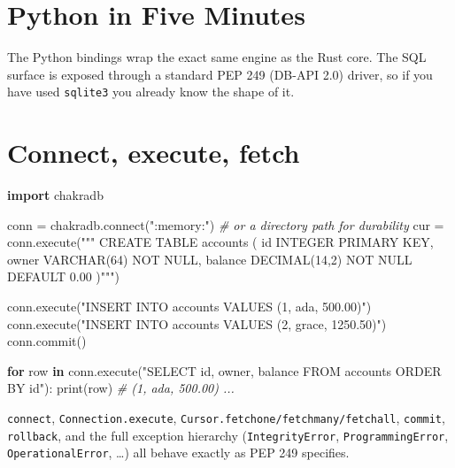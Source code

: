 \documentclass[
  11pt,
  openany]{book}
\newenvironment{Shaded}{}{}
\newcommand{\BuiltInTok}[1]{\textcolor[rgb]{0.00,0.50,0.00}{#1}}
\newcommand{\CommentTok}[1]{\textcolor[rgb]{0.38,0.63,0.69}{\textit{#1}}}
\newcommand{\ControlFlowTok}[1]{\textcolor[rgb]{0.00,0.44,0.13}{\textbf{#1}}}
\newcommand{\ExtensionTok}[1]{#1}
\newcommand{\ImportTok}[1]{\textcolor[rgb]{0.00,0.50,0.00}{\textbf{#1}}}
\newcommand{\KeywordTok}[1]{\textcolor[rgb]{0.00,0.44,0.13}{\textbf{#1}}}
\newcommand{\NormalTok}[1]{#1}
\newcommand{\OperatorTok}[1]{\textcolor[rgb]{0.40,0.40,0.40}{#1}}
\newcommand{\StringTok}[1]{\textcolor[rgb]{0.25,0.44,0.63}{#1}}
\begin{document}
\section{Python in Five Minutes}\label{python-in-five-minutes}

The Python bindings wrap the exact same engine as the Rust core. The SQL
surface is exposed through a standard PEP 249 (DB-API 2.0) driver, so if
you have used \texttt{sqlite3} you already know the shape of it.

\section{Connect, execute, fetch}\label{connect-execute-fetch}

\begin{Shaded}
\begin{Highlighting}[]
\ImportTok{import}\NormalTok{ chakradb}

\NormalTok{conn }\OperatorTok{=}\NormalTok{ chakradb.}\ExtensionTok{connect}\NormalTok{(}\StringTok{":memory:"}\NormalTok{)          }\CommentTok{\# or a directory path for durability}
\NormalTok{cur }\OperatorTok{=}\NormalTok{ conn.execute(}\StringTok{"""}
\StringTok{    CREATE TABLE accounts (}
\StringTok{        id      INTEGER PRIMARY KEY,}
\StringTok{        owner   VARCHAR(64) NOT NULL,}
\StringTok{        balance DECIMAL(14,2) NOT NULL DEFAULT 0.00}
\StringTok{    )"""}\NormalTok{)}

\NormalTok{conn.execute(}\StringTok{"INSERT INTO accounts VALUES (1, \textquotesingle{}ada\textquotesingle{}, 500.00)"}\NormalTok{)}
\NormalTok{conn.execute(}\StringTok{"INSERT INTO accounts VALUES (2, \textquotesingle{}grace\textquotesingle{}, 1250.50)"}\NormalTok{)}
\NormalTok{conn.commit()}

\ControlFlowTok{for}\NormalTok{ row }\KeywordTok{in}\NormalTok{ conn.execute(}\StringTok{"SELECT id, owner, balance FROM accounts ORDER BY id"}\NormalTok{):}
    \BuiltInTok{print}\NormalTok{(row)          }\CommentTok{\# (1, \textquotesingle{}ada\textquotesingle{}, \textquotesingle{}500.00\textquotesingle{})  ...}
\end{Highlighting}
\end{Shaded}

\texttt{connect}, \texttt{Connection.execute},
\texttt{Cursor.fetchone/fetchmany/fetchall}, \texttt{commit},
\texttt{rollback}, and the full exception hierarchy
(\texttt{IntegrityError}, \texttt{ProgrammingError},
\texttt{OperationalError}, \ldots) all behave exactly as PEP 249
specifies.
\end{document}
